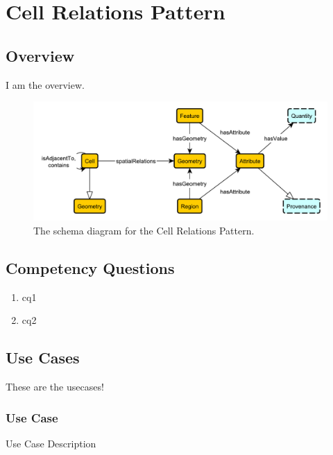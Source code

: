 
\section{Cell Relations Pattern}
\label{sec:cell-relations-pattern}
\subsection{Overview}
\label{ssec:overview}
I am the overview.

\begin{figure}[h!]
  \begin{center}
    \includegraphics[width=\textwidth]{resources/cell-relations-pattern.pdf}
  \end{center}
  \caption{The schema diagram for the Cell Relations Pattern.}
  \label{fig:ov-diagram}
\end{figure}


\subsection{Competency Questions}
\label{ssec:cqs}
\begin{enumerate}[\phantom{CQ }CQ 1.]
	\item cq1
	\item cq2
\end{enumerate}

\subsection{Use Cases}
\label{ssec:use-cases}
These are the usecases!

\subsubsection{Use Case}
Use Case Description

